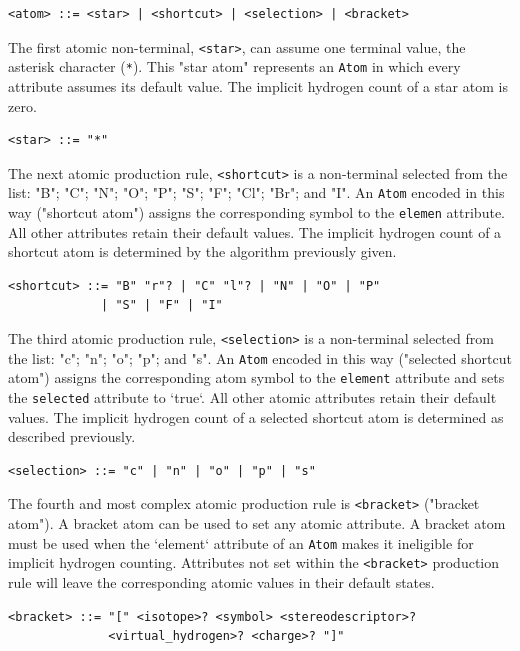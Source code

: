 \documentclass{article}
\def\ttt{\texttt}
\begin{document}
\begin{lstlisting}
<atom> ::= <star> | <shortcut> | <selection> | <bracket>
\end{lstlisting}

The first atomic non-terminal, \ttt{<star>}, can assume one terminal value, the asterisk character (\ttt{*}). This "star atom" represents an \ttt{Atom} in which every attribute assumes its default value. The implicit hydrogen count of a star atom is zero.

\begin{lstlisting}
<star> ::= "*"
\end{lstlisting}

The next atomic production rule, \ttt{<shortcut>} is a non-terminal selected from the list: "B"; "C"; "N"; "O"; "P"; "S"; "F"; "Cl"; "Br"; and "I". An \ttt{Atom} encoded in this way ("shortcut atom") assigns the corresponding symbol to the \ttt{elemen} attribute. All other attributes retain their default values. The implicit hydrogen count of a shortcut atom is determined by the algorithm previously given.

\begin{lstlisting}
<shortcut> ::= "B" "r"? | "C" "l"? | "N" | "O" | "P"
             | "S" | "F" | "I"
\end{lstlisting}

The third atomic production rule, \ttt{<selection>} is a non-terminal selected from the list: "c"; "n"; "o"; "p"; and "s". An \ttt{Atom} encoded in this way ("selected shortcut atom") assigns the corresponding atom symbol to the \ttt{element} attribute and sets the \ttt{selected} attribute to `true`. All other atomic attributes retain their default values. The implicit hydrogen count of a selected shortcut atom is determined as described previously.

\begin{lstlisting}
<selection> ::= "c" | "n" | "o" | "p" | "s"
\end{lstlisting}

The fourth and most complex atomic production rule is \ttt{<bracket>} ("bracket atom"). A bracket atom can be used to set any atomic attribute. A bracket atom must be used when the `element` attribute of an \ttt{Atom} makes it ineligible for implicit hydrogen counting. Attributes not set within the \ttt{<bracket>} production rule will leave the corresponding atomic values in their default states.

\begin{lstlisting}
<bracket> ::= "[" <isotope>? <symbol> <stereodescriptor>?
              <virtual_hydrogen>? <charge>? "]"
\end{lstlisting}
\end{document}
